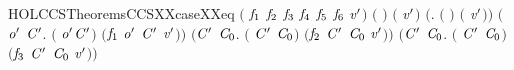 \begin{SaveVerbatim}{HOLCCSTheoremsCCSXXcaseXXeq}
\HOLTokenTurnstile{} \ensuremath{(}    \ensuremath{\HOLFreeVar{f}\sb{\mathrm{1}}} \ensuremath{\HOLFreeVar{f}\sb{\mathrm{2}}} \ensuremath{\HOLFreeVar{f}\sb{\mathrm{3}}} \ensuremath{\HOLFreeVar{f}\sb{\mathrm{4}}} \ensuremath{\HOLFreeVar{f}\sb{\mathrm{5}}} \ensuremath{\HOLFreeVar{f}\sb{\mathrm{6}}} \HOLSymConst{\ensuremath{=}} \ensuremath{\HOLFreeVar{v}\sp{\prime{}}}\ensuremath{)} \HOLSymConst{\HOLTokenEquiv{}}
   \ensuremath{(} \HOLSymConst{\ensuremath{=}} \ensuremath{)} \HOLSymConst{\HOLTokenConj{}} \ensuremath{(} \HOLSymConst{\ensuremath{=}} \ensuremath{\HOLFreeVar{v}\sp{\prime{}}}\ensuremath{)} \HOLSymConst{\HOLTokenDisj{}} \ensuremath{(}\HOLSymConst{\HOLTokenExists{}}. \ensuremath{(} \HOLSymConst{\ensuremath{=}}  \ensuremath{)} \HOLSymConst{\HOLTokenConj{}} \ensuremath{(}  \HOLSymConst{\ensuremath{=}} \ensuremath{\HOLFreeVar{v}\sp{\prime{}}}\ensuremath{)}\ensuremath{)} \HOLSymConst{\HOLTokenDisj{}}
   \ensuremath{(}\HOLSymConst{\HOLTokenExists{}}\ensuremath{\HOLBoundVar{o}\sp{\prime{}}} \ensuremath{\HOLBoundVar{C}\sp{\prime{}}}. \ensuremath{(} \HOLSymConst{\ensuremath{=}} \ensuremath{\HOLBoundVar{o}\sp{\prime{}}}\HOLSymConst{\ensuremath{\ldotp}}\ensuremath{\HOLBoundVar{C}\sp{\prime{}}}\ensuremath{)} \HOLSymConst{\HOLTokenConj{}} \ensuremath{(}\ensuremath{\HOLFreeVar{f}\sb{\mathrm{1}}} \ensuremath{\HOLBoundVar{o}\sp{\prime{}}} \ensuremath{\HOLBoundVar{C}\sp{\prime{}}} \HOLSymConst{\ensuremath{=}} \ensuremath{\HOLFreeVar{v}\sp{\prime{}}}\ensuremath{)}\ensuremath{)} \HOLSymConst{\HOLTokenDisj{}}
   \ensuremath{(}\HOLSymConst{\HOLTokenExists{}}\ensuremath{\HOLBoundVar{C}\sp{\prime{}}} \ensuremath{\HOLBoundVar{C}\sb{\mathrm{0}}}. \ensuremath{(} \HOLSymConst{\ensuremath{=}} \ensuremath{\HOLBoundVar{C}\sp{\prime{}}} \HOLSymConst{\ensuremath{+}} \ensuremath{\HOLBoundVar{C}\sb{\mathrm{0}}}\ensuremath{)} \HOLSymConst{\HOLTokenConj{}} \ensuremath{(}\ensuremath{\HOLFreeVar{f}\sb{\mathrm{2}}} \ensuremath{\HOLBoundVar{C}\sp{\prime{}}} \ensuremath{\HOLBoundVar{C}\sb{\mathrm{0}}} \HOLSymConst{\ensuremath{=}} \ensuremath{\HOLFreeVar{v}\sp{\prime{}}}\ensuremath{)}\ensuremath{)} \HOLSymConst{\HOLTokenDisj{}}
   \ensuremath{(}\HOLSymConst{\HOLTokenExists{}}\ensuremath{\HOLBoundVar{C}\sp{\prime{}}} \ensuremath{\HOLBoundVar{C}\sb{\mathrm{0}}}. \ensuremath{(} \HOLSymConst{\ensuremath{=}} \ensuremath{\HOLBoundVar{C}\sp{\prime{}}} \HOLSymConst{\ensuremath{\mid}} \ensuremath{\HOLBoundVar{C}\sb{\mathrm{0}}}\ensuremath{)} \HOLSymConst{\HOLTokenConj{}} \ensuremath{(}\ensuremath{\HOLFreeVar{f}\sb{\mathrm{3}}} \ensuremath{\HOLBoundVar{C}\sp{\prime{}}} \ensuremath{\HOLBoundVar{C}\sb{\mathrm{0}}} \HOLSymConst{\ensuremath{=}} \ensuremath{\HOLFreeVar{v}\sp{\prime{}}}\ensuremath{)}\ensuremath{)} \HOLSymConst{\HOLTokenDisj{}}

\end{SaveVerbatim}
